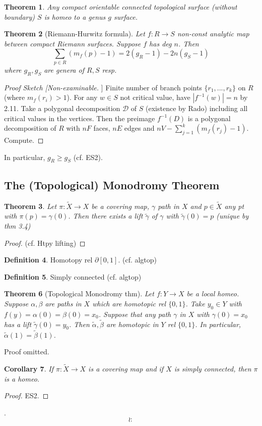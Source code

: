 \documentclass{article}
\theoremstyle{definition}
\newtheorem{defn}{Definition}[section]
\theoremstyle{remark}
\theoremstyle{plain}
\newtheorem{thm}[defn]{Theorem}
\newtheorem{crly}[defn]{Corollary}
\newcommand{\calD}{\mathcal{D}}
\begin{document}
\begin{thm}
    Any compact orientable connected topological surface (without boundary) $S$ is homeo to a genus $g$ surface.
\end{thm}
\begin{thm}[Riemann-Hurwitz formula]
    Let $f:R\to S$ non-const analytic map between compact Riemann surfaces. Suppose $f$ has deg $n$. Then \[\sum_{p\in R}(m_f(p)-1)=2(g_R-1)-2n(g_S-1)\]
    where $g_R,g_S$ are genera of $R,S$ resp.
\end{thm}
\begin{proof}[Proof Sketch [Non-examinable]]
    Finite number of branch points $\{r_1,...,r_k\}$ on $R$ (where $m_f(r_i)>1$). For any $w\in S$ not critical value, have $|f^{-1}(w)|=n$ by 2.11. Take a polygonal decomposition $\calD$ of $S$ (existence by Rado) including all critical values in the vertices. Then the preimage $f^{-1}(D)$ is a polygonal decomposition of $R$ with $nF$ faces, $nE$ edges and $nV-\sum_{j=1}^k(m_f(r_j)-1)$. Compute.
\end{proof}
In particular, $g_R\ge g_S$ (cf. ES2).

\subsection{The (Topological) Monodromy Theorem}
\begin{thm}
    Let $\pi:\tilde X\to X$ be a covering map, $\gamma$ path in $X$ and $p\in\tilde X$ any pt with $\pi(p)=\gamma(0)$. Then there exists a lift $\tilde\gamma$ of $\gamma$ with $\tilde\gamma(0)=p$ (unique by thm 3.4)
\end{thm}
\begin{proof}
    (cf. Htpy lifting)
\end{proof}
\begin{defn}
    Homotopy rel $\partial[0,1]$. (cf. algtop)
\end{defn}
\begin{defn}
    Simply connected (cf. algtop)
\end{defn}
\begin{thm}[Topological Monodromy thm]
    Let $f:Y\to X$ be a local homeo. Suppose $\alpha,\beta$ are paths in $X$ which are homotopic rel $\{0,1\}$. Take $y_0\in Y$ with $f(y)=\alpha(0)=\beta(0)=x_0$. Suppose that any path $\gamma$ in $X$ with $\gamma(0)=x_0$ has a lift $\tilde\gamma(0)=y_0$. Then $\tilde\alpha,\tilde\beta$ are homotopic in $Y$ rel $\{0,1\}$. In particular, $\tilde\alpha(1)=\tilde\beta(1)$.
\end{thm}
Proof omitted.
\begin{crly}
    If $\pi:\tilde X\to X$ is a covering map and if $X$ is simply connected, then $\pi$ is a homeo. 
\end{crly}
\begin{proof}
    ES2.
\end{proof}.
 \[\wr:\tag{Owen's Signature}\]
\end{document}
